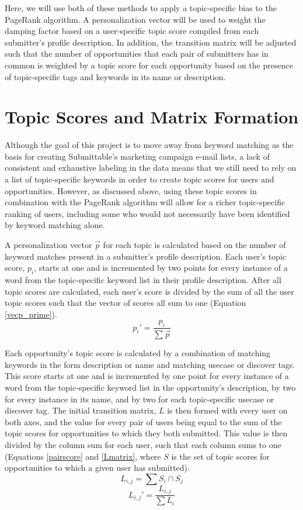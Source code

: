 \documentclass[]{report}   %
\begin{document}
Here, we will use both of these methods to apply a topic-specific bias to the PageRank algorithm. A personalization vector will be used to weight the damping factor based on a user-specific topic score compiled from each submitter's profile description. In addition, the transition matrix will be adjusted such that the number of opportunities that each pair of submitters has in common is weighted by a topic score for each opportunity based on the presence of topic-specific tags and keywords in its name or description.

\section{Topic Scores and Matrix Formation}\label{scoring}

Although the goal of this project is to move away from keyword matching as the basis for creating Submittable's marketing campaign e-mail lists, a lack of consistent and exhaustive labeling in the data means that we still need to rely on a list of topic-specific keywords in order to create topic scores for users and opportunities. However, as discussed above, using these topic scores in combination with the PageRank algorithm will allow for a richer topic-specific ranking of users, including some who would not necessarily have been identified by keyword matching alone.

A personalization vector $\vec{p}$ for each topic is calculated based on the number of keyword matches present in a submitter's profile description. Each user's topic score, $p_{i}$, starts at one and is incremented by two points for every instance of a word from the topic-specific keyword list in their profile description. After all topic scores are calculated, each user's score is divided by the sum of all the user topic scores such that the vector of scores all sum to one (Equation \ref{vecp_prime}).
\begin{equation}
\label{vecp_prime}
p_{i}'=\frac{p_i}{\sum{\vec{p}}}
\end{equation}

Each opportunity's topic score is calculated by a combination of matching keywords in the form description or name and matching usecase or discover tags. This score starts at one and is incremented by one point for every instance of a word from the topic-specific keyword list in the opportunity's description, by two for every instance in its name, and by two for each topic-specific usecase or discover tag. The initial transition matrix, $L$ is then formed with every user on both axes, and the value for every pair of users being equal to the sum of the topic scores for opportunities to which they both submitted. This value is then divided by the column sum for each user, such that each column sums to one (Equations \ref{pairscore} and \ref{Lmatrix}, where $S$ is the set of topic scores for opportunities to which a given user has submitted).
\begin{equation}
\label{pairscore}
L_{i,j}=\sum{S_i\cap S_j}
\end{equation}
\begin{equation}
\label{Lmatrix}
L_{i,j}' =\frac{L_{i,j}}{\sum{L_i}}
\end{equation}
\end{document}
